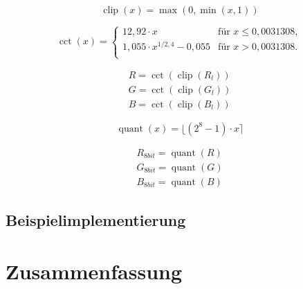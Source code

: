 \documentclass[10pt,a4paper,DIV=12,parskip=half]{scrarticle}
\begin{document}
\begin{equation*}
\operatorname{clip}(x)=\operatorname{max}(0, \operatorname{min}(x, 1))
\end{equation*}

\begin{equation*}
\operatorname{cct}(x)=
\begin{cases}
12,92 \cdot x & \text{für } x \leq 0,0031308, \\
1,055 \cdot x^{1/2,4} - 0,055 & \text{für } x > 0,0031308. \\
\end{cases}
\end{equation*}

\begin{equation*}
\begin{gathered}
R = \operatorname{cct}(\operatorname{clip}(R_{l})) \\
G = \operatorname{cct}(\operatorname{clip}(G_{l})) \\
B = \operatorname{cct}(\operatorname{clip}(B_{l}))
\end{gathered}
\end{equation*}

\begin{equation*}
\operatorname{quant}(x) = \lfloor (2^8-1) \cdot x \rceil
\end{equation*}

\begin{equation*}
\begin{gathered}
R_{8bit} = \operatorname{quant}(R) \\
G_{8bit} = \operatorname{quant}(G) \\
B_{8bit} = \operatorname{quant}(B)
\end{gathered}
\end{equation*}

\subsection*{Beispielimplementierung}



\section*{Zusammenfassung}


\printbibliography[title=Quellen]
\end{document}
